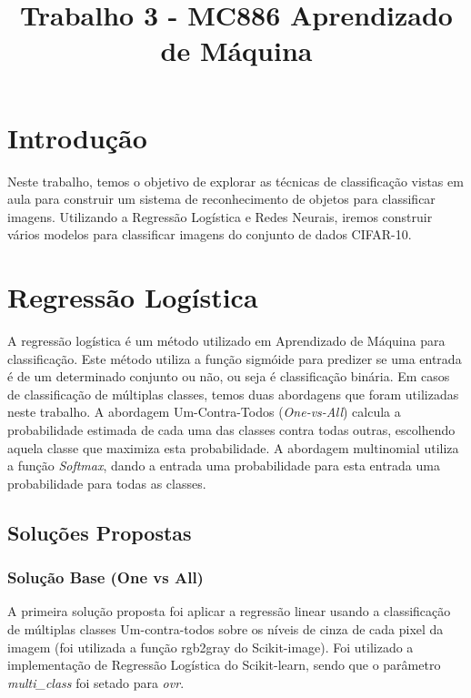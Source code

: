 \documentclass[conference]{IEEEtran}
\begin{document}
\title{Trabalho 3 - MC886 Aprendizado de Máquina}

\author{
\and
{}
}

\maketitle

\section{Introdução}


Neste trabalho, temos o objetivo de explorar as técnicas de classificação vistas em aula para construir um sistema de reconhecimento de objetos para classificar imagens. Utilizando a Regressão Logística e Redes Neurais, iremos construir vários modelos para classificar imagens do conjunto de dados CIFAR-10.

\section{Regressão Logística}
 
A regressão logística é um método utilizado em Aprendizado de Máquina para classificação. Este método utiliza a função sigmóide para predizer se uma entrada é de um determinado conjunto ou não, ou seja é classificação binária.
Em casos de classificação de múltiplas classes, temos duas abordagens que foram utilizadas neste trabalho.
A abordagem Um-Contra-Todos (\textit{One-vs-All}) calcula a probabilidade estimada de cada uma das classes contra todas outras, escolhendo aquela classe que maximiza esta probabilidade.
A abordagem multinomial utiliza a função \textit{Softmax}, dando a entrada uma probabilidade para esta entrada uma probabilidade para todas as classes.

\subsection{Soluções Propostas}

\subsubsection{Solução Base (One vs All)}
A primeira solução proposta foi aplicar a regressão linear usando a classificação de múltiplas classes Um-contra-todos sobre os níveis de cinza de cada pixel da imagem (foi utilizada a função rgb2gray do Scikit-image). Foi utilizado a implementação de Regressão Logística do Scikit-learn, sendo que o parâmetro \textit{multi\_class} foi setado para \textit{ovr}.
\end{document}
